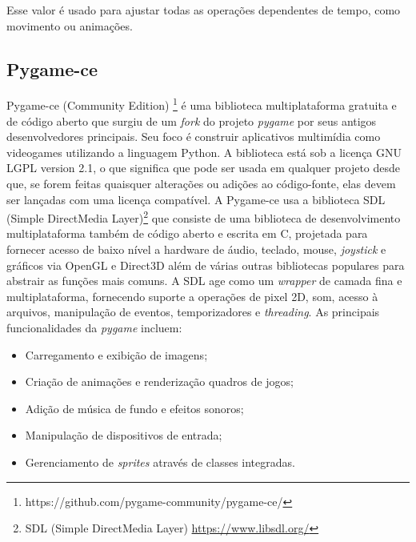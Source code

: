 Esse valor é usado para ajustar todas as operações dependentes de tempo, como movimento ou animações.

 
 
\subsection{Pygame-ce}
\label{sec:pygame-ce}
Pygame-ce (Community Edition) \footnote{https://github.com/pygame-community/pygame-ce/} é uma biblioteca multiplataforma gratuita e de código aberto que surgiu de um \textit{fork} do projeto \textit{pygame} por seus antigos desenvolvedores principais. Seu foco é construir aplicativos multimídia como videogames utilizando a linguagem Python. A biblioteca está sob a licença GNU LGPL version 2.1, o que significa que pode ser usada em qualquer projeto desde que, se forem feitas quaisquer alterações ou adições ao código-fonte, elas devem ser lançadas com uma licença compatível. 
 A Pygame-ce usa a biblioteca SDL (Simple DirectMedia Layer)\footnote{SDL (Simple DirectMedia Layer) \url{https://www.libsdl.org/}} que consiste de uma biblioteca de desenvolvimento multiplataforma também de código aberto e escrita em C, projetada para fornecer acesso de baixo nível a hardware de áudio, teclado, mouse, \textit{joystick} e gráficos via OpenGL e Direct3D além de várias outras bibliotecas populares para abstrair as funções mais comuns. A SDL age como um \textit{wrapper} de camada fina e multiplataforma, fornecendo suporte a operações de pixel 2D, som, acesso à arquivos, manipulação de eventos, temporizadores e \textit{threading}.
As principais funcionalidades da \textit{pygame} incluem:
\begin{itemize}
    \item Carregamento e exibição de imagens;
    \item Criação de animações e renderização quadros de jogos;
    \item Adição de música de fundo e efeitos sonoros;
    \item Manipulação de dispositivos de entrada;
    \item Gerenciamento de \textit{sprites} através de classes integradas.
\end{itemize}

